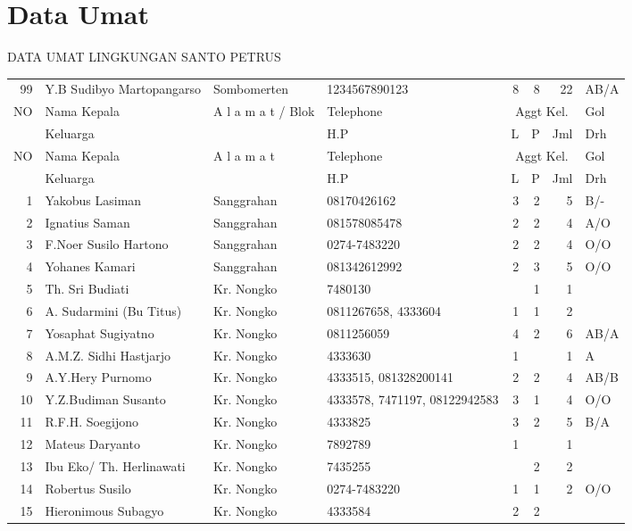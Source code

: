 \newpage
\section{Data Umat}
\begin{center}
DATA UMAT LINGKUNGAN SANTO PETRUS\\
\end{center}
\scriptsize
\begin{longtable}{|r|l|l|p{1.7cm}|r|r|r|p{0.7cm}|}
99	&Y.B Sudibyo Martopangarso	&Sombomerten	&1234567890123&8	&8	&22	&AB/A\\ \kill
\hline
NO	&Nama Kepala	&A l a m a t / Blok	&Telephone	&\multicolumn{3}{|c|}{Aggt Kel.}&Gol\\ \cline{5-7}
	&Keluarga	&	&H.P	&L	&P	&Jml	&Drh\\
\hline
\endfirsthead
\hline
NO	&Nama Kepala	&A l a m a t	&Telephone	&\multicolumn{3}{|c|}{Aggt Kel.}&Gol\\ \cline{5-7}
	&Keluarga	&	&H.P	&L	&P	&Jml	&Drh\\
\hline
\endhead
1	&Yakobus Lasiman	&Sanggrahan	&08170426162	&3	&2	&5	&B/-\\
2	&Ignatius Saman	&Sanggrahan	&081578085478	&2	&2	&4	&A/O\\
3	&F.Noer Susilo Hartono	&Sanggrahan	&0274-7483220	&2	&2	&4	&O/O\\
4	&Yohanes Kamari	&Sanggrahan	&081342612992	&2	&3	&5	&O/O\\
5	&Th. Sri Budiati	&Kr. Nongko	&7480130	&	&1	&1	&\\
6	&A. Sudarmini (Bu Titus)	&Kr. Nongko	&0811267658, 4333604	&1	&1	&2	&\\
7	&Yosaphat Sugiyatno	&Kr. Nongko	&0811256059	&4	&2	&6	&AB/A\\
8	&A.M.Z. Sidhi Hastjarjo	&Kr. Nongko	&4333630	&1	&	&1	&A\\
9	&A.Y.Hery Purnomo	&Kr. Nongko	&4333515, 081328200141	&2	&2	&4	&AB/B\\
10	&Y.Z.Budiman Susanto	&Kr. Nongko	&4333578, 7471197, 08122942583	&3	&1	&4	&O/O\\
11	&R.F.H. Soegijono	&Kr. Nongko	&4333825	&3	&2	&5	&B/A\\
12	&Mateus Daryanto	&Kr. Nongko	&7892789	&1	&	&1	&\\
13	&Ibu Eko/ Th. Herlinawati	&Kr. Nongko	&7435255	&	&2	&2	&\\
14	&Robertus Susilo	&Kr. Nongko	&0274-7483220&1&1&2&O/O\\
15	&Hieronimous Subagyo	&Kr. Nongko	&4333584	&2	&2	&	&\\

\end{longtable}
